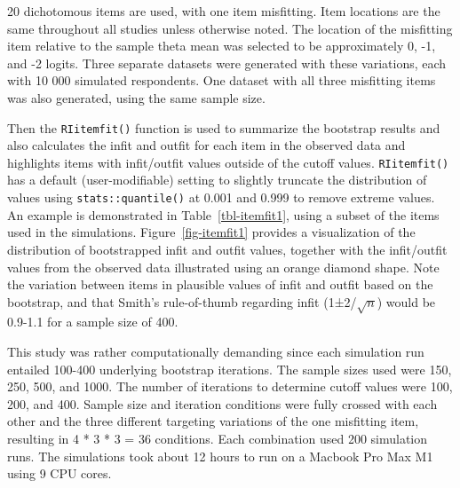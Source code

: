 \documentclass[
  letterpaper,
  DIV=11,
  numbers=noendperiod]{scrartcl}
\begin{document}
20 dichotomous items are used, with one item misfitting. Item locations
are the same throughout all studies unless otherwise noted. The location
of the misfitting item relative to the sample theta mean was selected to
be approximately 0, -1, and -2 logits. Three separate datasets were
generated with these variations, each with 10 000 simulated respondents.
One dataset with all three misfitting items was also generated, using
the same sample size.

Then the \texttt{RIitemfit()} function is used to summarize the
bootstrap results and also calculates the infit and outfit for each item
in the observed data and highlights items with infit/outfit values
outside of the cutoff values. \texttt{RIitemfit()} has a default
(user-modifiable) setting to slightly truncate the distribution of
values using \texttt{stats::quantile()} at 0.001 and 0.999 to remove
extreme values. An example is demonstrated in Table~\ref{tbl-itemfit1},
using a subset of the items used in the simulations.
Figure~\ref{fig-itemfit1} provides a visualization of the distribution
of bootstrapped infit and outfit values, together with the infit/outfit
values from the observed data illustrated using an orange diamond shape.
Note the variation between items in plausible values of infit and outfit
based on the bootstrap, and that Smith's rule-of-thumb regarding infit
(1±2/\(\sqrt{n}\)) would be 0.9-1.1 for a sample size of 400.

This study was rather computationally demanding since each simulation
run entailed 100-400 underlying bootstrap iterations. The sample sizes
used were 150, 250, 500, and 1000. The number of iterations to determine
cutoff values were 100, 200, and 400. Sample size and iteration
conditions were fully crossed with each other and the three different
targeting variations of the one misfitting item, resulting in 4 * 3 * 3
= 36 conditions. Each combination used 200 simulation runs. The
simulations took about 12 hours to run on a Macbook Pro Max M1 using 9
CPU cores.
\end{document}
